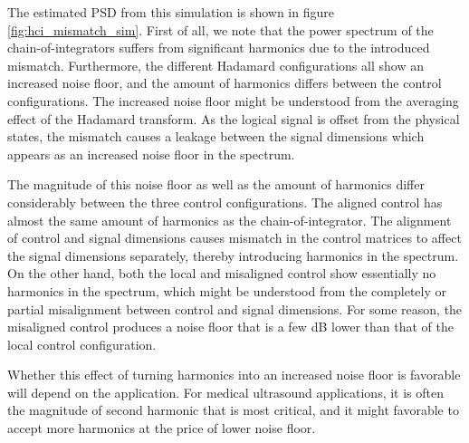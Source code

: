 The estimated PSD from this simulation is shown in figure \ref{fig:hci_mismatch_sim}. First of all, we note that the power spectrum of the chain-of-integrators suffers from significant harmonics due to the introduced mismatch. Furthermore, the different Hadamard configurations all show an increased noise floor, and the amount of harmonics differs between the control configurations. The increased noise floor might be understood from the averaging effect of the Hadamard transform. As the logical signal is offset from the physical states, the mismatch causes a leakage between the signal dimensions which appears as an increased noise floor in the spectrum.

The magnitude of this noise floor as well as the amount of harmonics differ considerably between the three control configurations. The aligned control has almost the same amount of harmonics as the chain-of-integrator. The alignment of control and signal dimensions causes mismatch in the control matrices to affect the signal dimensions separately, thereby introducing harmonics in the spectrum. On the other hand, both the local and misaligned control show essentially no harmonics in the spectrum, which might be understood from the completely or partial misalignment between control and signal dimensions. For some reason, the misaligned control produces a noise floor that is a few dB lower than that of the local control configuration.

Whether this effect of turning harmonics into an increased noise floor is favorable will depend on the application. For medical ultrasound applications, it is often the magnitude of second harmonic that is most critical, and it might favorable to accept more harmonics at the price of lower noise floor.


